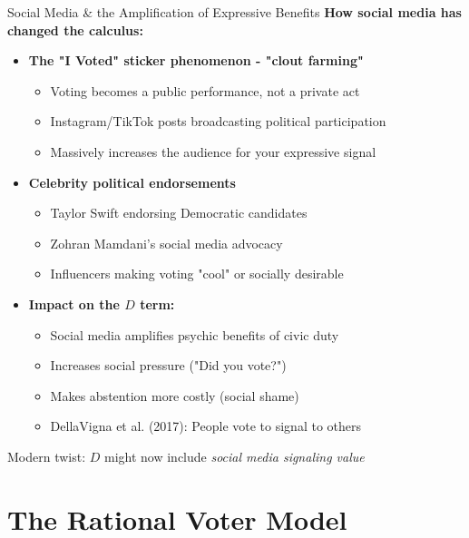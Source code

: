 \documentclass[10pt]{beamer}
\begin{document}
\begin{frame}{Social Media \& the Amplification of Expressive Benefits}
\textbf{How social media has changed the calculus:}

\begin{itemize}
\item \textbf{The "I Voted" sticker phenomenon - "clout farming"}
\begin{itemize}
\item Voting becomes a public performance, not a private act
\item Instagram/TikTok posts broadcasting political participation
\item Massively increases the \alert{audience} for your expressive signal
\end{itemize}

\item \textbf{Celebrity political endorsements}
\begin{itemize}
\item Taylor Swift endorsing Democratic candidates
\item Zohran Mamdani's social media advocacy
\item Influencers making voting "cool" or socially desirable
\end{itemize}

\item \textbf{Impact on the $D$ term:}
\begin{itemize}
\item Social media \alert{amplifies} psychic benefits of civic duty
\item Increases social pressure ("Did you vote?")
\item Makes abstention more costly (social shame)
\item DellaVigna et al. (2017): People vote to signal to others
\end{itemize}
\end{itemize}


\alert{Modern twist:} $D$ might now include \emph{social media signaling value}
\end{frame}

\section{The Rational Voter Model}
\end{document}
